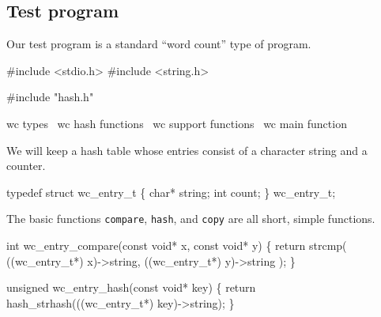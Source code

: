 \subsection{Test program}

Our test program is a standard ``word count'' type of program.

\nwenddocs{}\endmoddef
#include <stdio.h>
#include <string.h>

#include "hash.h"

\LA{}wc types~{\nwtagstyle{}}\RA{}
\LA{}wc hash functions~{\nwtagstyle{}}\RA{}
\LA{}wc support functions~{\nwtagstyle{}}\RA{}
\LA{}wc main function~{\nwtagstyle{}}\RA{}
\nwendcode{}\nwdocspar

We will keep a hash table whose entries consist of a character
string and a counter.

\nwenddocs{}\endmoddef
typedef struct wc_entry_t \{
    char* string;
    int count;
\} wc_entry_t;

\nwendcode{}\nwdocspar

The basic functions {\tt{}compare}, {\tt{}hash}, and {\tt{}copy} are all
short, simple functions.

\nwenddocs{}\endmoddef
int wc_entry_compare(const void* x, const void* y)
\{
    return strcmp( ((wc_entry_t*) x)->string, 
                   ((wc_entry_t*) y)->string );
\}

\nwendcode{}\nwdocspar

\nwenddocs{}\plusendmoddef
unsigned wc_entry_hash(const void* key)
\{
    return hash_strhash(((wc_entry_t*) key)->string);
\}

